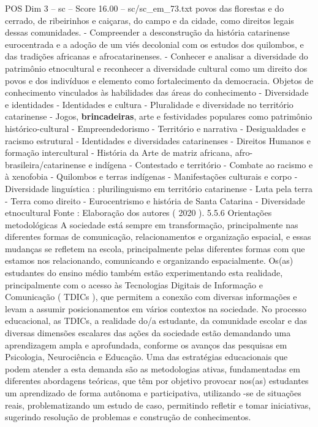 \begin{textsample}{POS Dim 3 – sc – Score 16.00 – sc/sc\_em\_73.txt}
povos das florestas e do cerrado, de ribeirinhos e caiçaras, do campo e da cidade, como direitos legais dessas comunidades. - Compreender a desconstrução da história catarinense eurocentrada e a adoção de um viés decolonial com os estudos dos quilombos, e das tradições africanas e afrocatarinenses. - Conhecer e analisar a diversidade do patrimônio etnocultural e reconhecer a diversidade cultural como um direito dos povos e dos indivíduos e elemento como fortalecimento da democracia.
Objetos de conhecimento vinculados às habilidades das áreas do conhecimento - Diversidade e identidades - Identidades e cultura - Pluralidade e diversidade no território catarinense - Jogos, \textbf{brincadeiras}, arte e festividades populares como patrimônio histórico-cultural - Empreendedorismo - Território e narrativa - Desigualdades e racismo estrutural - Identidades e diversidades catarinenses - Direitos Humanos e formação intercultural - História da Arte de matriz africana, afro-brasileira/catarinense e indígena - Contestado e território - Combate ao racismo e à xenofobia - Quilombos e terras indígenas - Manifestações culturais e corpo - Diversidade linguística : plurilinguismo em território catarinense - Luta pela terra - Terra como direito - Eurocentrismo e história de Santa Catarina - Diversidade etnocultural Fonte : Elaboração dos autores ( 2020 ). 5.5.6 Orientações metodológicas A sociedade está sempre em transformação, principalmente nas diferentes formas de comunicação, relacionamentos e organização espacial, e essas mudanças se refletem na escola, principalmente pelas diferentes formas com que estamos nos relacionando, comunicando e organizando espacialmente.
Os(as) estudantes do ensino médio também estão experimentando esta realidade, principalmente com o acesso às Tecnologias Digitais de Informação e Comunicação ( TDICs ), que permitem a conexão com diversas informações e levam a assumir posicionamentos em vários contextos na sociedade.
No processo educacional, as TDICs, a realidade do/a estudante, da comunidade escolar e das diversas dimensões escalares das ações da sociedade estão demandando uma aprendizagem ampla e aprofundada, conforme os avanços das pesquisas em Psicologia, Neurociência e Educação.
Uma das estratégias educacionais que podem atender a esta demanda são as metodologias ativas, fundamentadas em diferentes abordagens teóricas, que têm por objetivo provocar nos(as) estudantes um aprendizado de forma autônoma e participativa, utilizando -se de situações reais, problematizando um estudo de caso, permitindo refletir e tomar iniciativas, sugerindo resolução de problemas e construção de conhecimentos.

\end{textsample}
